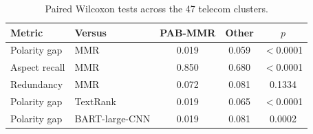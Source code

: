 \begin{table}[H]
\centering
\small
\caption{Paired Wilcoxon tests across the 47 telecom clusters.}
\label{tab:telecomtest}
\begin{tabular}{llccc}
\toprule
Metric & Versus & PAB-MMR & Other & $p$ \\
\midrule
Polarity gap & MMR & 0.019 & 0.059 & $<$0.0001 \\
Aspect recall & MMR & 0.850 & 0.680 & $<$0.0001 \\
Redundancy & MMR & 0.072 & 0.081 & 0.1334 \\
Polarity gap & TextRank & 0.019 & 0.065 & $<$0.0001 \\
Polarity gap & BART-large-CNN & 0.019 & 0.081 & 0.0002 \\
\bottomrule
\end{tabular}
\end{table}